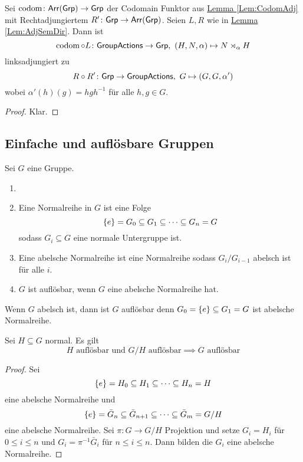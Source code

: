 \begin{Lemma}
    Sei $\operatorname{codom}\colon \mathsf{Arr}(\mathsf{Grp})\to\mathsf{Grp}$ der Codomain Funktor aus \hyperref[Lem:CodomAdj]{Lemma \ref{Lem:CodomAdj}} mit Rechtadjungiertem $R'\colon\mathsf{Grp}\to\mathsf{Arr}(\mathsf{Grp})$.
    Seien $L,R$ wie in \hyperref[Lem:AdjSemDir]{Lemma \ref{Lem:AdjSemDir}}. Dann ist $$\codom\circ L\colon \Grpact\to \Grp,\ (H,N,\alpha)\mapsto N\rtimes_\alpha H$$ linksadjungiert zu 
    $$R\circ R'\colon \mathsf{Grp}\to\mathsf{GroupActions},\ G\mapsto (G,G,\alpha')$$ wobei $\alpha'(h)(g)=hgh^{-1}$ für alle $h,g\in G$.
\end{Lemma}
\begin{proof}
    Klar.
\end{proof}
    
\subsection{Einfache und auflösbare Gruppen}
Sei $G$ eine Gruppe.
\begin{Def}
    \begin{enumerate}
        \item []
        \item Eine Normalreihe in $G$ ist eine Folge $$\{e\}=G_0\subseteq G_1\subseteq \dots\subseteq G_n=G$$ sodass $G_i\subseteq G$ eine normale Untergruppe ist.
        \item Eine abelsche Normalreihe ist eine Normalreihe sodass $G_i/G_{i-1}$ abelsch ist für alle $i$.
        \item $G$ ist auflösbar, wenn $G$ eine abelsche Normalreihe hat.
    \end{enumerate}
\end{Def}
\begin{Bsp}
    Wenn $G$ abelsch ist, dann ist $G$ auflösbar denn $G_0=\{e\}\subseteq G_1=G$ ist abelsche Normalreihe.
\end{Bsp}
\begin{Lemma}\label{Lem:AuflUntQuot}
    Sei $H\subseteq G$ normal. Es gilt 
    $$H \text{ auflösbar und } G/H \text{ auflösbar}\implies G \text{ auflösbar}$$
\end{Lemma}
\begin{proof}
    Sei $$\{e\}=H_0\subseteq H_1\subseteq \dots\subseteq H_n=H$$ eine abelsche Normalreihe und $$\{e\}=\bar G_n\subseteq\bar G_{n+1}\subseteq\dots \subseteq \bar G_m=G/H$$ eine abelsche Normalreihe. Sei $\pi\colon G\to G/H$ Projektion und setze $G_i=H_i$ für $0\leq i\leq n$ und $G_i=\pi^{-1}\bar G_i$  für $n\leq i\leq n$.
    Dann bilden die $G_i$ eine abelsche Normalreihe.
\end{proof}
